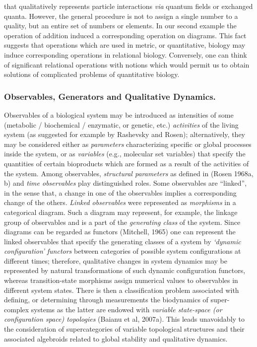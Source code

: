 \documentclass[12pt]{article}
\theoremstyle{plain}
\theoremstyle{definition}
\numberwithin{equation}{section}
\newcommand{\<}{{\langle}}
\begin{document}
that qualitatively represents particle interactions \emph{via} quantum fields or exchanged quanta. 
However, the general procedure is not to assign a single number to a quality, but an entire set of numbers or elements. In our second example the operation of addition induced a corresponding operation on diagrams. This fact suggests that operations which are used in metric, or quantitative, biology may induce corresponding operations in relational biology. Conversely, one can think of significant relational operations with notions which would permit us to obtain solutions of complicated problems of quantitative biology.

\subsubsection{Observables, Generators and Qualitative Dynamics.} 

 Observables of a biological system may be introduced as intensities of some 
(metabolic / biochemical / enzymatic, or genetic, etc.) \emph{activities} of the living system (as suggested for example by Rashevsky and Rosen); alternatively, they may be considered either as \emph{parameters} characterizing specific or global processes inside the system, or as \emph{variables} (e.g., molecular set variables) that specify the quantities of certain bioproducts which are formed as a result of the activities of the system. Among observables, 
\emph{structural parameters} as defined in (Rosen 1968a, b) and \emph{time observables} play distinguished roles. Some observables are ``linked'', in the sense that, a change in one of the observables implies a corresponding change of the others. \emph{Linked observables} were represented as \emph{morphisms} in a categorical diagram. Such a diagram may represent, for example, the linkage group of observables and is a part of the \emph{generating class} of the system. Since diagrams can be regarded as functors (Mitchell, 1965) one can represent the linked observables that specify the generating classes of a system by \emph{`dynamic configuration' functors} between categories of possible system configurations at different times; therefore, qualitative changes in system dynamics may be represented by natural transformations of such dynamic configuration functors, whereas transition-state morphisms assign numerical values to observables in different system states. There is then a classification problem associated with defining, or determining through measurements the biodynamics of super-complex systems as the latter are endowed with \emph{variable state-space (or configuration space) topologies} (Baianu et al, 2007a). This leads unavoidably to the consideration of supercategories of variable topological structures and their associated algebroids related to global stability and qualitative dynamics.
\end{document}
